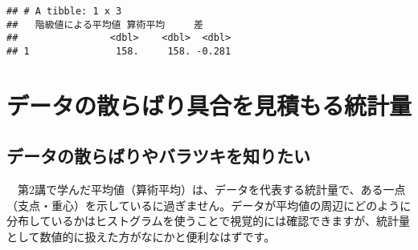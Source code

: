 \documentclass[
  12pt,
]{book}
\newenvironment{Shaded}{\begin{snugshade}}{\end{snugshade}}
\newcommand{\AttributeTok}[1]{\textcolor[rgb]{0.77,0.63,0.00}{#1}}
\newcommand{\FunctionTok}[1]{\textcolor[rgb]{0.00,0.00,0.00}{#1}}
\newcommand{\NormalTok}[1]{#1}
\newcommand{\OtherTok}[1]{\textcolor[rgb]{0.56,0.35,0.01}{#1}}
\newcommand{\SpecialCharTok}[1]{\textcolor[rgb]{0.00,0.00,0.00}{#1}}
\newcommand{\StringTok}[1]{\textcolor[rgb]{0.31,0.60,0.02}{#1}}
\begin{document}
\begin{Shaded}
\end{Shaded}

\begin{verbatim}
## # A tibble: 1 x 3
##   階級値による平均値 算術平均     差
##                <dbl>    <dbl>  <dbl>
## 1               158.     158. -0.281
\end{verbatim}

\hypertarget{ux30c7ux30fcux30bfux306eux6563ux3089ux3070ux308aux5177ux5408ux3092ux898bux7a4dux3082ux308bux7d71ux8a08ux91cf}{%
\chapter{データの散らばり具合を見積もる統計量}\label{ux30c7ux30fcux30bfux306eux6563ux3089ux3070ux308aux5177ux5408ux3092ux898bux7a4dux3082ux308bux7d71ux8a08ux91cf}}

\hypertarget{ux30c7ux30fcux30bfux306eux6563ux3089ux3070ux308aux3084ux30d0ux30e9ux30c4ux30adux3092ux77e5ux308aux305fux3044}{%
\section{データの散らばりやバラツキを知りたい}\label{ux30c7ux30fcux30bfux306eux6563ux3089ux3070ux308aux3084ux30d0ux30e9ux30c4ux30adux3092ux77e5ux308aux305fux3044}}

　第2講で学んだ平均値（算術平均）は、データを代表する統計量で、ある一点（支点・重心）を示しているに過ぎません。データが平均値の周辺にどのように分布しているかはヒストグラムを使うことで視覚的には確認できますが、統計量として数値的に扱えた方がなにかと便利なはずです。
\end{document}
